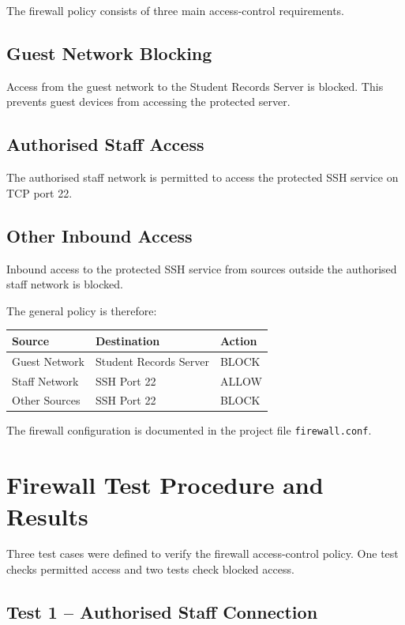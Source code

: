 \documentclass[12pt,a4paper]{article}
\begin{document}
The firewall policy consists of three main access-control requirements.

\subsection{Guest Network Blocking}

Access from the guest network to the Student Records Server is blocked.
This prevents guest devices from accessing the protected server.

\subsection{Authorised Staff Access}

The authorised staff network is permitted to access the protected SSH
service on TCP port 22.

\subsection{Other Inbound Access}

Inbound access to the protected SSH service from sources outside the
authorised staff network is blocked.

The general policy is therefore:

\begin{center}
\begin{tabular}{lll}
\textbf{Source} & \textbf{Destination} & \textbf{Action} \\
\hline
Guest Network & Student Records Server & BLOCK \\
Staff Network & SSH Port 22 & ALLOW \\
Other Sources & SSH Port 22 & BLOCK \\
\end{tabular}
\end{center}

The firewall configuration is documented in the project file
\texttt{firewall.conf}.

\section{Firewall Test Procedure and Results}

Three test cases were defined to verify the firewall access-control
policy. One test checks permitted access and two tests check blocked
access.

\subsection{Test 1 -- Authorised Staff Connection}
\end{document}
